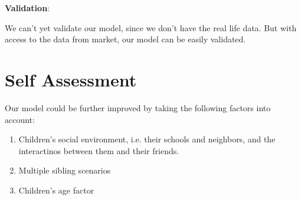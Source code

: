 \documentclass[article, 11pt, a4paper, onesize]{memoir}
\begin{document}
\textbf{Validation}:

We can't yet validate our model, since we don't have the real life data. But with access
to the data from market, our model can be easily validated.




\section{Self Assessment}

Our model could be further improved by taking the following factors into account:

\begin{enumerate}
    \item Children's social environment, i.e. their schools and neighbors, and the
        interactinos between them and their friends.
    \item Multiple sibling scenarios
    \item Children's age factor
\end{enumerate}
\end{document}
